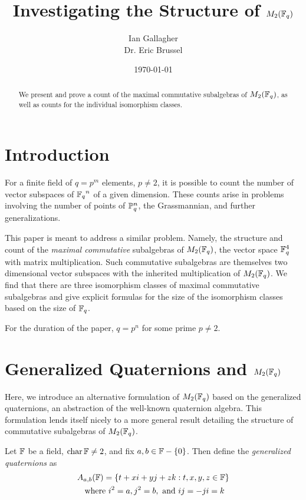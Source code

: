 \documentclass{amsart}
\title{Investigating the Structure of $M_2(\protect\mathbb{F}_q)$}
\author{Ian Gallagher \\ Dr. Eric Brussel}
\date{\today}
\begin{document}
\maketitle

\begin{abstract}
    We present and prove a count of the maximal commutative subalgebras of
    $M_2(\protect\mathbb{F}_q)$, as well as counts for the individual isomorphism classes. 
\end{abstract}

\section{Introduction}
For a finite field of $q = p^m$ elements, $p \neq 2$, it is possible to count the number of
vector subspaces of ${\protect\mathbb{F}_q}^n$ of a given dimension. These counts arise in
problems involving the number of points of $\protect\mathbb{P}^n_q$, the Grassmannian,
and further generalizations. %

This paper is meant to address a similar problem. Namely, the structure and 
count of the \textit{maximal commutative} subalgebras of $M_2(\protect\mathbb{F}_q)$, the vector space $\protect\mathbb{F}_q^4$ with matrix multiplication. Such commutative subalgebras are themselves two dimensional vector subspaces with the inherited multiplication of $M_2(\protect\mathbb{F}_q)$. We find that there are three isomorphism classes of maximal commutative subalgebras and give explicit formulas for the size of the isomorphism classes based on the size of $\protect\mathbb{F}_q$.


For the duration of the paper, $q = p^n$ for some prime $p \neq 2$.

\section{Generalized Quaternions and $M_2(\protect\mathbb{F}_q)$}
Here, we introduce an alternative formulation of $M_2(\protect\mathbb{F}_q)$ based on the generalized quaternions, an abstraction of the well-known quaternion algebra. This formulation lends itself nicely to a more general result detailing the structure of commutative subalgebras of $M_2(\protect\mathbb{F}_q)$.

\begin{defn}
    Let $\protect\mathbb{F}$ be a field, $\operatorname{char} \protect\mathbb{F} \neq 2$, and fix $a,b \in \protect\mathbb{F}-\{0\}$. Then define the \textit{generalized quaternions} as
\begin{gather*}
    A_{a,b}(\protect\mathbb{F}) = \{t + xi + yj + zk : t,x,y,z \in \protect\mathbb{F}\} \\
    \text{ where }i^2 =a, j^2 = b, \text{ and } ij = -ji=k
\end{gather*}
\end{defn}
\end{document}
